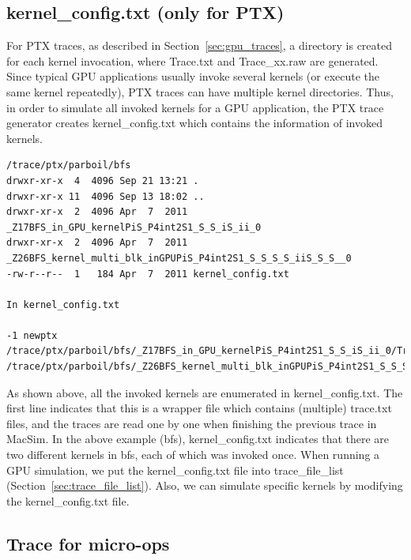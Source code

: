 \subsection{kernel\_config.txt (only for PTX)}

For PTX traces, as described in Section~\ref{sec:gpu_traces}, a directory is
created for each kernel invocation, where Trace.txt and Trace\_xx.raw are
generated. Since typical GPU applications usually invoke several kernels (or
    execute the same kernel repeatedly), PTX traces can have multiple kernel
directories. Thus, in order to simulate all invoked kernels for a GPU
application, the PTX trace generator creates kernel\_config.txt which contains
the information of invoked kernels.


\begin{Verbatim}
/trace/ptx/parboil/bfs
drwxr-xr-x  4  4096 Sep 21 13:21 .
drwxr-xr-x 11  4096 Sep 13 18:02 ..
drwxr-xr-x  2  4096 Apr  7  2011 _Z17BFS_in_GPU_kernelPiS_P4int2S1_S_S_iS_ii_0
drwxr-xr-x  2  4096 Apr  7  2011 _Z26BFS_kernel_multi_blk_inGPUPiS_P4int2S1_S_S_S_S_iiS_S_S__0
-rw-r--r--  1   184 Apr  7  2011 kernel_config.txt

In kernel_config.txt

-1 newptx
/trace/ptx/parboil/bfs/_Z17BFS_in_GPU_kernelPiS_P4int2S1_S_S_iS_ii_0/Trace.txt
/trace/ptx/parboil/bfs/_Z26BFS_kernel_multi_blk_inGPUPiS_P4int2S1_S_S_S_S_iiS_S_S__0/Trace.txt
\end{Verbatim}


As shown above, all the invoked kernels are enumerated in kernel\_config.txt.
The first line indicates that this is a wrapper file which contains (multiple) trace.txt files, and
the traces are read one by one when finishing the previous trace in MacSim.
In the above example (bfs), kernel\_config.txt indicates that there are two different
kernels in bfs, each of which was invoked once. When running a GPU simulation, we put 
the kernel\_config.txt file into trace\_file\_list (Section~\ref{sec:trace_file_list}). 
Also, we can simulate specific kernels by modifying the kernel\_config.txt file.

\subsection{Trace for micro-ops}

